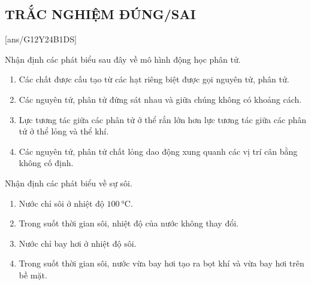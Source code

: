 \subsection{TRẮC NGHIỆM ĐÚNG/SAI}
[ans/G12Y24B1DS]
\setcounter{ex}{0}
\begin{ex}
	Nhận định các phát biểu sau đây về mô hình động học phân tử.
	\begin{enumerate}[label=\alph*)]
		\item Các chất được cấu tạo từ các hạt riêng biệt được gọi nguyên tử, phân tử.
		\item Các nguyên tử, phân tử đứng sát nhau và giữa chúng không có khoảng cách.
		\item Lực tương tác giữa các phân tử ở thể rắn lớn hơn lực tương tác giữa các phân tử ở thể lỏng và thể khí.
		\item Các nguyên tử, phân tử chất lỏng dao động xung quanh các vị trí cân bằng không cố định.
	\end{enumerate}
	\end{ex}
\begin{ex}
	Nhận định các phát biểu về sự sôi.
	\begin{enumerate}[label=\alph*)]
		\item Nước chỉ sôi ở nhiệt độ $\SI{100}{\celsius}$.
		\item Trong suốt thời gian sôi, nhiệt độ của nước không thay đổi.
		\item Nước chỉ bay hơi ở nhiệt độ sôi.
		\item Trong suốt thời gian sôi, nước vừa bay hơi tạo ra bọt khí và vừa bay hơi trên bề mặt.
	\end{enumerate}
	\end{ex}


